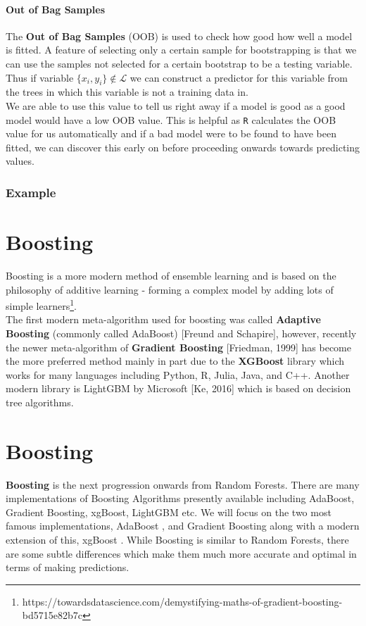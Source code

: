 \documentclass[11pt,a4paper]{report}
\begin{document}
\subsubsection{Out of Bag Samples}
The \textbf{Out of Bag Samples} (OOB) is used to check how good how well a model is fitted. 
A feature of selecting only a certain sample for bootstrapping is that we can use the samples not selected for a certain bootstrap to be a testing variable. 
Thus if variable $\{x_i, y_i\} \notin \mathcal{L}$ we can construct a predictor for this variable from the trees in which this variable is not a training data in.
\bigskip\\
We are able to use this value to tell us right away if a model is good as a good model would have a low OOB value. 
This is helpful as \texttt{R} calculates the OOB value for us automatically and if a bad model were to be found to have been fitted, we can discover this early on before proceeding onwards towards predicting values.

\subsection{Example}


\chapter{Boosting}
Boosting is a more modern method of ensemble learning and is based on the philosophy of additive learning - forming a complex model by adding lots of simple learners\footnote{https://towardsdatascience.com/demystifying-maths-of-gradient-boosting-bd5715e82b7c}.\\
\bigskip
The first modern meta-algorithm used for boosting was called \textbf{Adaptive Boosting} (commonly called AdaBoost) [Freund and Schapire], however, recently the newer meta-algorithm of \textbf{Gradient Boosting} [Friedman, 1999] has become the more preferred method mainly in part due to the \textbf{XGBoost} library which works for many languages including Python, R, Julia, Java, and C++. Another modern library is LightGBM by Microsoft [Ke, 2016] which is based on decision tree algorithms.

\chapter{Boosting}
\textbf{Boosting} is the next progression onwards from Random Forests.
There are many implementations of Boosting Algorithms presently available including AdaBoost, Gradient Boosting, xgBoost, LightGBM etc.
We will focus on the two most famous implementations, AdaBoost \cite{adaboost}, and Gradient Boosting \cite{gbm} along with a modern extension of this, xgBoost \cite{xgboost}.
While Boosting is similar to Random Forests, there are some subtle differences which make them much more accurate and optimal in terms of making predictions.
\end{document}

